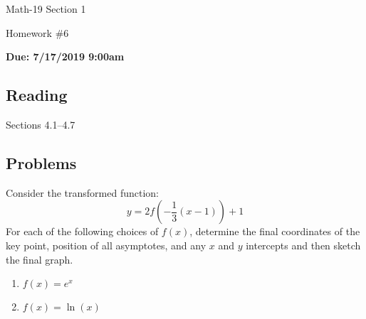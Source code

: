 \documentclass[letterpaper,12pt,fleqn]{article}
\begin{document}
\begin{center}
  \large
  Math-19 Section 1

  \Large
  Homework \#6

  \large
  \textbf{Due: 7/17/2019 9:00am}
\end{center}

\subsection*{Reading}

Sections 4.1--4.7

\subsection*{Problems}

Consider the transformed function:
\[y=2f\left(-\frac{1}{3}(x-1)\right)+1\]
For each of the following choices of \(f(x)\), determine the final coordinates of the key point, position of all
asymptotes, and any \(x\) and \(y\) intercepts and then sketch the final graph.

\begin{enumerate}
\item \(f(x)=e^x\)
\item \(f(x)=\ln(x)\)
\end{enumerate}
\end{document}

